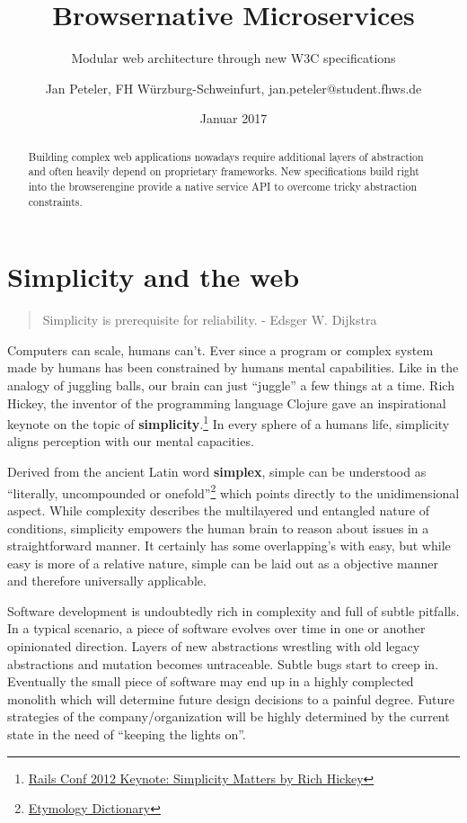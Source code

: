 \documentclass[]{article}
\title{Browsernative Microservices}
\subtitle{Modular web architecture through new W3C specifications}
\author{Jan Peteler, FH Würzburg-Schweinfurt, jan.peteler@student.fhws.de}
\date{Januar 2017}
\begin{document}
\maketitle
\begin{abstract}
Building complex web applications nowadays require additional layers of
abstraction and often heavily depend on proprietary frameworks. New
specifications build right into the browserengine provide a native
service API to overcome tricky abstraction constraints.
\end{abstract}

{
\setcounter{tocdepth}{3}
\tableofcontents
}
\section{Simplicity and the web}\label{simplicity-and-the-web}

\begin{quote}
Simplicity is prerequisite for reliability. - Edsger W. Dijkstra
\end{quote}

Computers can scale, humans can't. Ever since a program or complex
system made by humans has been constrained by humans mental
capabilities. Like in the analogy of juggling balls, our brain can just
``juggle'' a few things at a time. Rich Hickey, the inventor of the
programming language Clojure gave an inspirational keynote on the topic
of \textbf{simplicity}.\footnote{\href{https://www.youtube.com/watch?v=rI8tNMsozo0\&t=46s}{Rails
  Conf 2012 Keynote: Simplicity Matters by Rich Hickey}} In every sphere
of a humans life, simplicity aligns perception with our mental
capacities.

Derived from the ancient Latin word \textbf{simplex}, simple can be
understood as ``literally, uncompounded or onefold''\footnote{\href{http://www.etymonline.com/index.php?term=simple}{Etymology
  Dictionary}} which points directly to the unidimensional aspect. While
complexity describes the multilayered und entangled nature of
conditions, simplicity empowers the human brain to reason about issues
in a straightforward manner. It certainly has some overlapping's with
easy, but while easy is more of a relative nature, simple can be laid
out as a objective manner and therefore universally applicable.

Software development is undoubtedly rich in complexity and full of
subtle pitfalls. In a typical scenario, a piece of software evolves over
time in one or another opinionated direction. Layers of new abstractions
wrestling with old legacy abstractions and mutation becomes untraceable.
Subtle bugs start to creep in. Eventually the small piece of software
may end up in a highly complected monolith which will determine future
design decisions to a painful degree. Future strategies of the
company/organization will be highly determined by the current state in
the need of ``keeping the lights on''.
\end{document}

